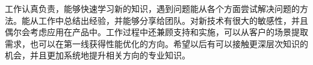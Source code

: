 \begin{cvline}
  \cvsingleline 
  {
  	\begin{cvitems}
    	\item {工作认真负责，能够快速学习新的知识，遇到问题能从各个方面尝试解决问题的方法。能从工作中总结出经验，并能够分享给团队。对新技术有很大的敏感性，并且偶尔会考虑应用在产品中。工作过程中还兼顾支持和实施，可以从客户的场景提取需求，也可以在第一线获得性能优化的方向。希望以后有可以接触更深层次知识的机会，并且更加系统地提升相关方向的专业知识。}
    \end{cvitems}
  }
\end{cvline}
